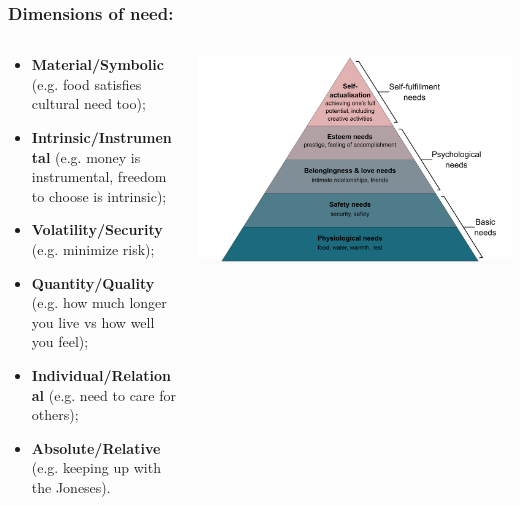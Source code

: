 \documentclass[aspectratio=169]{beamer}
\theoremstyle{principle}
\begin{document}
\begin{frame}
\frametitle{Dimensions of need:}
\begin{columns}
\begin{column}{0.5\textwidth}

\begin{itemize}
\item \textbf{Material/Symbolic} (e.g. food satisfies cultural need too);
\item \textbf{Intrinsic/Instrumental} (e.g. money is instrumental, freedom to choose is intrinsic);
\item \textbf{Volatility/Security} (e.g. minimize risk);
\item \textbf{Quantity/Quality} (e.g. how much longer you live vs how well you feel);
\item \textbf{Individual/Relational} (e.g. need to care for others);
\item \textbf{Absolute/Relative} (e.g. keeping up with the Joneses).
\end{itemize}
\end{column}
\begin{column}{0.5\textwidth}
\includegraphics[scale=0.2]{maslow.png}
\end{column}
\end{columns}
\end{frame}
\end{document}
